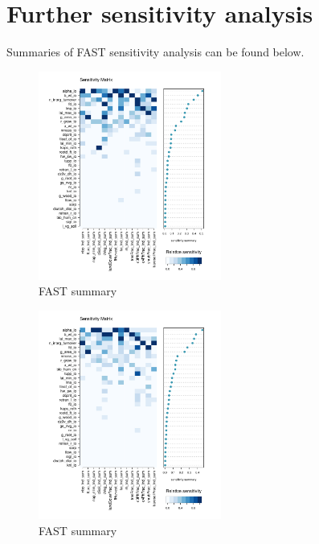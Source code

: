 \documentclass[gmd, manuscript]{copernicus}
\begin{document}
\section{Further sensitivity analysis}

Summaries of FAST sensitivity analysis can be found below.

\begin{figure}[t]
\includegraphics[width=6cm]{./graphics/FAST_sensmat_Y_level1a.pdf}
\caption{FAST summary}
\label{fig:FAST_sensmat_Y_level1a}
\end{figure}

\begin{figure}[t]
\includegraphics[width=6cm]{./graphics/FAST_sensmat_YAnom_level1a.pdf}
\caption{FAST summary}
\label{fig:FAST_sensmat_YAnom_level1a}
\end{figure}



\noappendix       %

\end{document}
